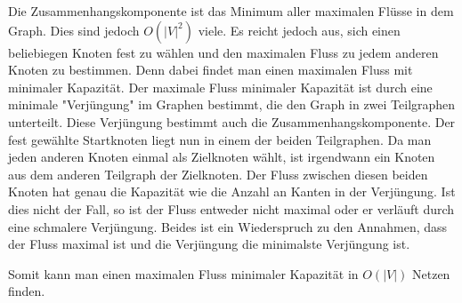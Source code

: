 \documentclass[a4paper,10pt]{article}
\begin{document}
Die Zusammenhangskomponente ist das Minimum aller maximalen Flüsse in dem Graph. Dies sind jedoch $O(|V|^2)$ viele.
Es reicht jedoch aus, sich einen beliebiegen Knoten fest zu wählen und den maximalen Fluss zu jedem anderen Knoten zu bestimmen. Denn dabei findet man einen maximalen Fluss mit minimaler Kapazität. Der maximale Fluss minimaler Kapazität ist durch eine minimale "Verjüngung" im Graphen bestimmt, die den Graph in zwei Teilgraphen unterteilt. Diese Verjüngung bestimmt auch die Zusammenhangskomponente. Der fest gewählte Startknoten liegt nun in einem der beiden Teilgraphen. Da man jeden anderen Knoten einmal als Zielknoten wählt, ist irgendwann ein Knoten aus dem anderen Teilgraph der Zielknoten. Der Fluss zwischen diesen beiden Knoten hat genau die Kapazität wie die Anzahl an Kanten in der Verjüngung. Ist dies nicht der Fall, so ist der Fluss entweder nicht maximal oder er verläuft durch eine schmalere Verjüngung. Beides ist ein Wiederspruch zu den Annahmen, dass der Fluss maximal ist und die Verjüngung die minimalste Verjüngung ist.

Somit kann man einen maximalen Fluss minimaler Kapazität in $O(|V|)$ Netzen finden.
\end{document}

